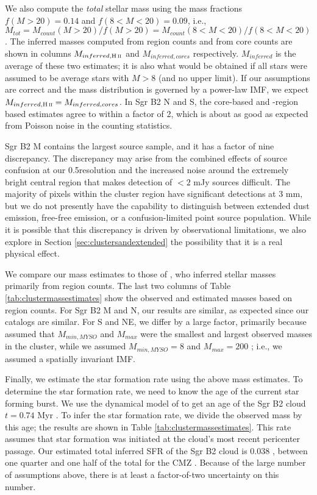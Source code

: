 \documentclass[twocolumn]{aastex61}
\begin{document}
We also compute the \emph{total} stellar mass using the mass fractions $f(M>20)
= 0.14$ and $f(8<M<20)=0.09$, i.e., $M_{tot} = M_{count}(M>20) / f(M>20) =
M_{count}(8<M<20) / f(8<M<20)$.  The inferred masses computed from \hii region
counts and from core counts are shown in columns $M_{inferred,\hii}$ and
$M_{inferred,cores}$ respectively. $M_{inferred}$ is the average of these two
estimates; it is also what would be obtained if all stars were assumed to be
average stars with $M>8$ \msun (and no upper limit).  If our assumptions are
correct and the mass distribution is governed by a power-law IMF, we expect
$M_{inferred,\hii} = M_{inferred,cores}$.  In Sgr B2 N and S, the core-based
and \hii-region based estimates agree to
within a factor of 2, which is about as good as expected from Poisson noise in
the counting statistics.  

Sgr B2 M contains the largest source sample, and it has a factor of nine
discrepancy. The discrepancy may arise from the combined effects of source
confusion at our 0.5\arcsec resolution and the increased noise around the
extremely bright central region that makes detection of $<2$ mJy sources
difficult.  The majority of pixels within the cluster region have significant
detections at 3 mm, but we do not presently have the capability to distinguish
between extended dust emission, free-free emission, or a confusion-limited
point source population.  While it is possible that this discrepancy
is driven by observational limitations, we also explore in Section
\ref{sec:clustersandextended} the possibility that it is a real physical
effect.

We compare our mass estimates to those of \citet{Schmiedeke2016a}, who inferred
stellar masses primarily from \hii region counts.  The last two columns of Table
\ref{tab:clustermassestimates} show the observed and estimated masses based on
\hii region counts.  For Sgr B2 M and N, our results are similar, as expected
since our catalogs are similar.  For S and NE, we differ by a large factor,
primarily because \citet{Schmiedeke2016a} assumed that $M_{min,MYSO}$ and $M_{max}$
were the smallest and largest observed masses in the cluster, while we assumed
$M_{min,MYSO}=8$ \msun and $M_{max}=200$ \msun; i.e., we assumed a spatially
invariant IMF.



Finally, we estimate the star formation rate using the above mass estimates.
To determine the star formation rate, we need to know the age of the current
star forming burst.  We use the dynamical model of \citet{Kruijssen2015a} to
get an age of the Sgr B2 cloud $t=0.74$ Myr \citep{Longmore2013a}.  To infer
the star formation rate, we divide the observed mass by this age; the results
are shown in Table \ref{tab:clustermassestimates}.  This rate assumes that star
formation was initiated at the cloud's most recent pericenter passage.  Our
estimated total inferred SFR of the Sgr B2 cloud is 0.038 \msun \peryr, between
one quarter and one half of the total for the CMZ
\citep{Longmore2013a,Barnes2017b}.  Because of the large number of assumptions
above, there is at least a factor-of-two uncertainty on this number.
\end{document}

